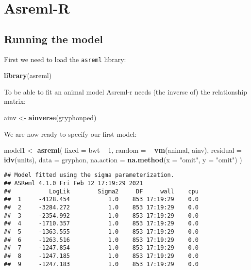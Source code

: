 \documentclass[12pt,]{book}
\newenvironment{Shaded}{\begin{snugshade}}{\end{snugshade}}
\newcommand{\DataTypeTok}[1]{\textcolor[rgb]{0.13,0.29,0.53}{#1}}
\newcommand{\DecValTok}[1]{\textcolor[rgb]{0.00,0.00,0.81}{#1}}
\newcommand{\KeywordTok}[1]{\textcolor[rgb]{0.13,0.29,0.53}{\textbf{#1}}}
\newcommand{\NormalTok}[1]{#1}
\newcommand{\OperatorTok}[1]{\textcolor[rgb]{0.81,0.36,0.00}{\textbf{#1}}}
\newcommand{\StringTok}[1]{\textcolor[rgb]{0.31,0.60,0.02}{#1}}
\begin{document}
\hypertarget{asreml-r-1}{%
\section{Asreml-R}\label{asreml-r-1}}

\hypertarget{running-the-model}{%
\subsection{Running the model}\label{running-the-model}}

First we need to load the \texttt{asreml} library:

\begin{Shaded}
\begin{Highlighting}[]
\KeywordTok{library}\NormalTok{(asreml)}
\end{Highlighting}
\end{Shaded}

To be able to fit an animal model Asreml-r needs (the inverse of) the relationship matrix:

\begin{Shaded}
\begin{Highlighting}[]
\NormalTok{ainv <-}\StringTok{ }\KeywordTok{ainverse}\NormalTok{(gryphonped)}
\end{Highlighting}
\end{Shaded}

We are now ready to specify our first model:

\begin{Shaded}
\begin{Highlighting}[]
\NormalTok{model1 <-}\StringTok{ }\KeywordTok{asreml}\NormalTok{(}
  \DataTypeTok{fixed =}\NormalTok{ bwt }\OperatorTok{~}\StringTok{ }\DecValTok{1}\NormalTok{, }\DataTypeTok{random =} \OperatorTok{~}\StringTok{ }\KeywordTok{vm}\NormalTok{(animal, ainv),}
  \DataTypeTok{residual =} \OperatorTok{~}\StringTok{ }\KeywordTok{idv}\NormalTok{(units),}
  \DataTypeTok{data =}\NormalTok{ gryphon,}
  \DataTypeTok{na.action =} \KeywordTok{na.method}\NormalTok{(}\DataTypeTok{x =} \StringTok{"omit"}\NormalTok{, }\DataTypeTok{y =} \StringTok{"omit"}\NormalTok{)}
\NormalTok{)}
\end{Highlighting}
\end{Shaded}

\begin{verbatim}
## Model fitted using the sigma parameterization.
## ASReml 4.1.0 Fri Feb 12 17:19:29 2021
##           LogLik        Sigma2     DF     wall    cpu
##  1     -4128.454           1.0    853 17:19:29    0.0
##  2     -3284.272           1.0    853 17:19:29    0.0
##  3     -2354.992           1.0    853 17:19:29    0.0
##  4     -1710.357           1.0    853 17:19:29    0.0
##  5     -1363.555           1.0    853 17:19:29    0.0
##  6     -1263.516           1.0    853 17:19:29    0.0
##  7     -1247.854           1.0    853 17:19:29    0.0
##  8     -1247.185           1.0    853 17:19:29    0.0
##  9     -1247.183           1.0    853 17:19:29    0.0
\end{verbatim}
\end{document}
